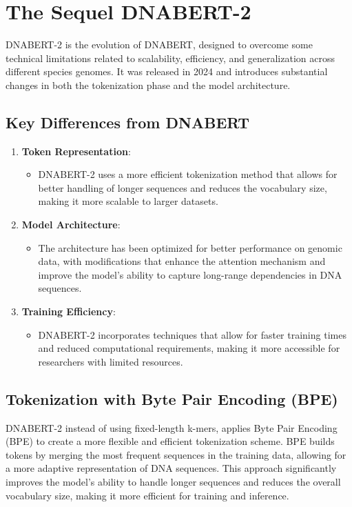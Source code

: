 \section{The Sequel DNABERT-2}

DNABERT-2 is the evolution of DNABERT, designed to overcome some technical limitations related to scalability, efficiency, and generalization across different species genomes. It was released in 2024 and introduces substantial changes in both the tokenization phase and the model architecture.

\subsection{Key Differences from DNABERT}
\begin{enumerate}
\item \textbf{Token Representation}: 
   \begin{itemize}
   \item DNABERT-2 uses a more efficient tokenization method that allows for better handling of longer sequences and reduces the vocabulary size, making it more scalable to larger datasets.
   \end{itemize}
\item \textbf{Model Architecture}:
   \begin{itemize}
   \item The architecture has been optimized for better performance on genomic data, with modifications that enhance the attention mechanism and improve the model's ability to capture long-range dependencies in DNA sequences.
   \end{itemize}
\item \textbf{Training Efficiency}:
   \begin{itemize}
   \item DNABERT-2 incorporates techniques that allow for faster training times and reduced computational requirements, making it more accessible for researchers with limited resources.
   \end{itemize}
\end{enumerate}

\subsection{Tokenization with Byte Pair Encoding (BPE)}

DNABERT-2 instead of using fixed-length k-mers, applies Byte Pair Encoding (BPE) to create a more flexible and efficient tokenization scheme. BPE builds tokens by merging the most frequent sequences in the training data, allowing for a more adaptive representation of DNA sequences. This approach significantly improves the model's ability to handle longer sequences and reduces the overall vocabulary size, making it more efficient for training and inference.

